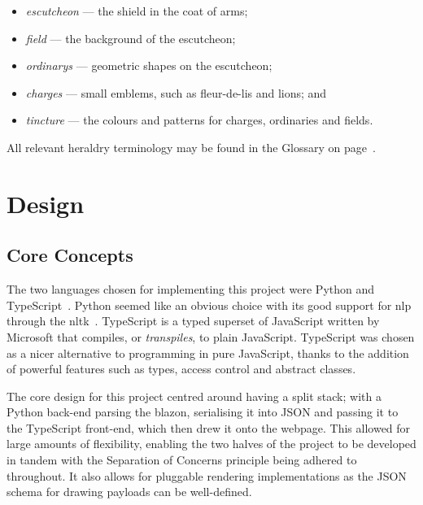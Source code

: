 \documentclass[nobib, a4paper, twoside, justified]{tufte-book}
\makeatletter
\newcommand{\charges}{\glspl{charge}\@\xspace}
\makeatother
\begin{document}
\begin{itemize}
  \item \textit{\Gls{escutcheon}} --- the shield in the coat of arms;
  \item \textit{\Gls{field}} --- the background of the escutcheon;
  \item \textit{\Glspl{ordinary}} --- geometric shapes on the escutcheon;
  \item \textit{\Glspl{charge}} --- small emblems, such as fleur-de-lis and lions; and
  \item \textit{\Gls{tincture}} --- the colours and patterns for \charges{}, ordinaries and fields.
\end{itemize}

All relevant heraldry terminology may be found in the Glossary on page~\pageref{glossary}.

\chapter{Design}%
\label{cha:design}

\section{Core Concepts}%
\label{sec:core_concepts}

The two languages chosen for implementing this project were Python and
TypeScript~\autocite{typescript}. Python seemed like an obvious choice with its good support for
\gls{nlp} through the \gls{nltk}~\autocite{bird2004nltk}. TypeScript is a typed superset of
JavaScript written by Microsoft that compiles, or \textit{\glspl{transpile}}, to plain JavaScript.
TypeScript was chosen as a nicer alternative to programming in pure JavaScript, thanks to the
addition of powerful features such as types, access control and abstract classes.

The core design for this project centred around having a split stack; with a Python back-end
parsing the blazon, serialising it into JSON  and passing it to the TypeScript front-end, which then drew it
onto the webpage. This allowed for large amounts of flexibility, enabling the two halves of the
project to be developed in tandem with the Separation of Concerns principle being adhered to
throughout. It also allows for pluggable rendering implementations as the JSON schema for drawing
payloads can be well-defined.
\end{document}
